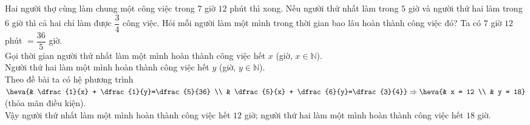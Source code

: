 \begin{bt}%
	Hai người thợ cùng làm chung một công việc trong $7$ giờ $12$ phút thì xong. Nếu người thứ nhất làm trong $5$ giờ và người thứ hai làm trong $6$ giờ thì cả hai chỉ làm được $\dfrac{3}{4}$ công việc. Hỏi mỗi người làm một mình trong thời gian bao lâu hoàn thành công việc đó?	
	\loigiai
	{
	Ta có $7$ giờ $12$ phút $= \dfrac{36}{5}$ giờ.\\
	Gọi thời gian người thứ nhất làm một mình hoàn thành công việc hết $x$ (giờ, $x \in \mathbb{N}$).\\
	Người thứ hai làm một mình hoàn thành công việc hết $y$ (giờ, $y \in \mathbb{N}$).\\
	Theo đề bài ta có hệ phương trình $\heva{& \dfrac{1}{x} + \dfrac{1}{y}=\dfrac{5}{36} \\ & \dfrac{5}{x} + \dfrac{6}{y}=\dfrac{3}{4}} \Rightarrow \heva{& x = 12 \\ & y = 18}$ (thỏa mãn điều kiện).\\
	Vậy người thứ nhất làm một mình hoàn thành công việc hết $12$ giờ; người thứ hai làm một mình hoàn thành công việc hết $18$ giờ.
	}
\end{bt}
